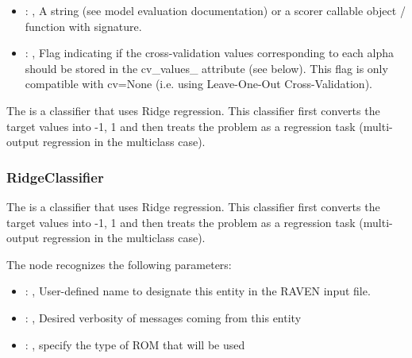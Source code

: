 \begin{itemize}
    \item {}: , 
      A string (see model evaluation documentation) or a scorer
      callable object / function with signature.

    \item {}: , 
      Flag indicating if the cross-validation values corresponding
      to each alpha should be stored in the cv\_values\_ attribute (see below).
      This flag is only compatible with cv=None (i.e. using Leave-One-Out
      Cross-Validation).
  \end{itemize}
 The  is a classifier that uses Ridge regression.
 This classifier first converts the target values into {-1, 1} and then treats
 the problem as a regression task (multi-output regression in the multiclass case).

\subsubsection{RidgeClassifier}
  The  is a classifier that uses Ridge regression.
  This classifier first converts the target values into {-1, 1} and then treats
  the problem as a regression task (multi-output regression in the multiclass case).

  The  node recognizes the following parameters:
    \begin{itemize}
      \item {}: , 
        User-defined name to designate this entity in the RAVEN input file.
      \item {}: , 
        Desired verbosity of messages coming from this entity
      \item {}: , 
        specify the type of ROM that will be used
  \end{itemize}

